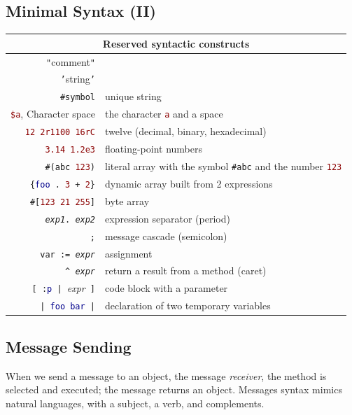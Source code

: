 \documentclass[notumble]{leaflet}
\newcommand{\code}[1]{\foreignlanguage{english}{\texttt{#1}}}
\begin{document}
\subsection{Minimal Syntax (II)}
\noindent
\begin{tabularx}{\linewidth}{@{}rX@{}}
        \toprule
        \multicolumn{2}{c}{Reserved syntactic constructs}\\
        \midrule
        \textcolor{comment}{\code{"}{comment}\code{"}} & \\
        \textcolor{string}{\code{'}{string}\code{'}} & \\
        \textcolor{string}{\code{\#symbol}} & unique string \\
        \textcolor{darkRed}{\code{\$a}}, Character space & the character \textcolor{darkRed}{\code{a}} and a space \\
        \textcolor{darkRed}{\code{12 2r1100 16rC}} & twelve (decimal, binary, hexadecimal)\\
        \textcolor{darkRed}{\code{3.14 1.2e3}} & floating-point numbers\\
        \code{\#(\textcolor{string}{abc} \textcolor{darkRed}{123})} & literal array with the symbol \textcolor{string}{\code{\#abc}} and the number \textcolor{darkRed}{\code{123}} \\
        \code{\{\textcolor{darkBlue}{foo}\,.\ \textcolor{darkRed}{3}\,+\,\textcolor{darkRed}{2}\}} & dynamic array built from 2 expressions\\
        \code{\#[\textcolor{darkRed}{123 21 255}]} & byte array \\
        \code{\emph{exp1}. \emph{exp2}} & expression separator (period)\\
        \code{;} & message cascade (semicolon)\\
        \code{var := \emph{expr}} & {assignment} \\
        \code{\textasciicircum\ \emph{expr}} & return a result from a method (caret)\\
        \code{[\,:\textcolor{darkBlue}{p}\,|\,}\emph{expr}\code{\,]} & code block with a parameter \\
        \code{|\,\textcolor{darkBlue}{foo bar}\,|} & declaration of two temporary variables \\
        \bottomrule
\end{tabularx}


\subsection{Message Sending}
When we send a message to an object, the message
\emph{receiver}, the method is selected and executed; the message returns an object. Messages syntax mimics
natural languages, with a subject, a verb, and complements. 
\end{document}
